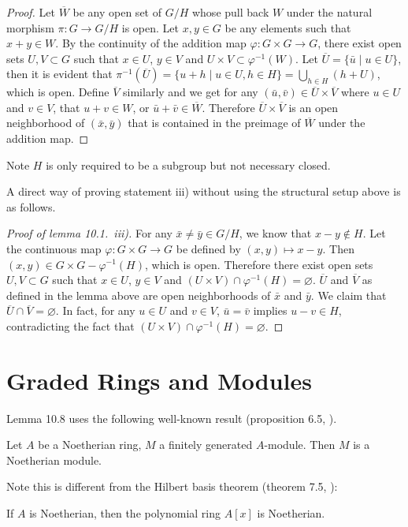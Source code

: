 \documentclass{note}
\begin{document}
\begin{proof}
  Let $\overline{W}$ be any open set of $G/H$ whose pull back $W$
  under the natural morphism $\pi\colon G \to G/H$ is open. Let
  $x,y \in G$ be any elements such that $x + y \in W$. By the
  continuity of the addition map $\varphi\colon G \times G \to G$,
  there exist open sets $U,V \subset G$ such that $x\in U$, $y\in V$
  and $U\times V \subset \varphi^{-1}(W)$. Let
  $\overline{U} = \{\bar{u} \mid u \in U\}$, then it is evident that
  $\pi^{-1}\left(\overline{U}\right) = \{u+h \mid u \in U, h \in H\} =
  \bigcup_{h\in H}(h+U)$, which is open. Define $\overline{V}$
  similarly and we get for any
  $(\bar{u},\bar{v}) \in \overline{U}\times\overline{V}$ where
  $u \in U$ and $v \in V$, that $u + v \in W$, or
  $\bar{u} + \bar{v} \in \overline{W}$. Therefore
  $\overline{U} \times \overline{V}$ is an open neighborhood of
  $(\bar{x},\bar{y})$ that is contained in the preimage of
  $\overline{W}$ under the addition map.
\end{proof}

\begin{remark*}
  Note $H$ is only required to be a subgroup but not necessary closed.
\end{remark*}

A direct way of proving statement iii) without using the structural
setup above is as follows.

\begin{proof}[Proof of lemma 10.1.~iii)] For any
  $\bar{x} \neq \bar{y} \in G/H$, we know that $x - y \notin H$. Let
  the continuous map $\varphi\colon G\times G \to G$ be defined by
  $(x,y) \mapsto x - y$. Then $(x,y) \in G\times G - \varphi^{-1}(H)$,
  which is open. Therefore there exist open sets $U,V \subset G$ such
  that $x\in U$, $y\in V$ and
  $(U\times V) \cap \varphi^{-1}(H) = \varnothing$. $\overline{U}$ and
  $\overline{V}$ as defined in the lemma above are open neighborhoods
  of $\bar{x}$ and $\bar{y}$. We claim that
  $\overline{U} \cap \overline{V} = \varnothing$. In fact, for any
  $u\in U$ and $v\in V$, $\bar{u} = \bar{v}$ implies
  $u - v \in H$, contradicting the fact that
  $(U\times V) \cap \varphi^{-1}(H) = \varnothing$.  
\end{proof}

\section*{Graded Rings and Modules}
Lemma 10.8 uses the following well-known result (proposition 6.5,
).
\begin{proposition*}
  Let $A$ be a Noetherian ring, $M$ a finitely generated
  $A$-module. Then $M$ is a Noetherian module.
\end{proposition*}
Note this is different from the Hilbert basis theorem (theorem 7.5,
):
\begin{theorem*}
  If $A$ is Noetherian, then the polynomial ring $A[x]$ is Noetherian.
\end{theorem*}
\end{document}
